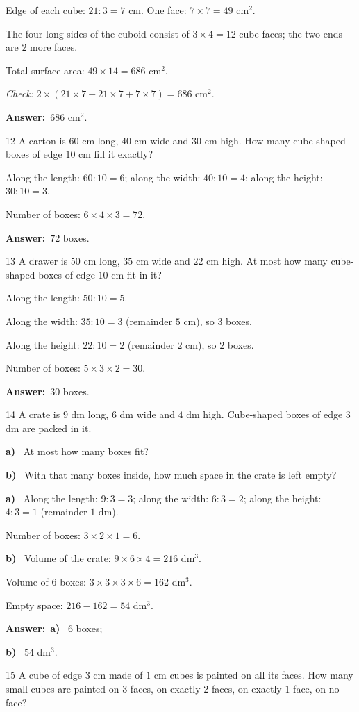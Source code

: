 \documentclass[11pt]{article}
\newif\ifsol \solfalse
\providecommand{\AnsWord}{Đáp số}
\newcommand{\dapso}[1]{\par\textbf{\AnsWord:}\ #1}
\newcommand{\probsol}[1]{%
  \begin{lrbox}{\solmeasure}\begin{minipage}{\dimexpr\linewidth-24pt\relax}#1\end{minipage}\end{lrbox}%
  \ifsol
    \begin{solbox}#1\end{solbox}%
  \else
    \setlength{\solht}{\dimexpr\ht\solmeasure+\dp\solmeasure+0.85cm\relax}%
    \ifdim\solht<1.35cm\setlength{\solht}{1.35cm}\fi
    \begin{tcolorbox}[colback=white,colframe=Line,boxrule=0.8pt,arc=5pt,
      left=8pt,right=8pt,top=4pt,bottom=4pt,height=\solht]{\footnotesize\color{Slate}\itshape\WorkWord}\end{tcolorbox}%
  \fi}
\newcommand{\pa}[1]{\textbf{#1)}\ }
\newcommand{\gap}{\vspace{0.3cm}}
\def\WorkWord{Your work:}
\def\AnsWord{Answer}
\begin{document}
\probsol{
Edge of each cube: $21:3=7$ cm. One face: $7\times7=49$ cm$^2$.\par
The four long sides of the cuboid consist of $3\times4=12$ cube faces; the two ends are $2$ more faces.\par
Total surface area: $49\times14=686$ cm$^2$.\par
\emph{Check:} $2\times(21\times7+21\times7+7\times7)=686$ cm$^2$.
\dapso{$686$ cm$^2$.}}
\gap
\begin{probbox}{12}{\relax}
A carton is $60$ cm long, $40$ cm wide and $30$ cm high. How many cube-shaped boxes of edge $10$ cm fill it exactly?
\end{probbox}
\probsol{
Along the length: $60:10=6$; along the width: $40:10=4$; along the height: $30:10=3$.\par
Number of boxes: $6\times4\times3=72$.
\dapso{$72$ boxes.}}
\gap
\begin{probbox}{13}{\relax}
A drawer is $50$ cm long, $35$ cm wide and $22$ cm high. At most how many cube-shaped boxes of edge $10$ cm fit in it?
\end{probbox}
\probsol{
Along the length: $50:10=5$.\par
Along the width: $35:10=3$ (remainder $5$ cm), so $3$ boxes.\par
Along the height: $22:10=2$ (remainder $2$ cm), so $2$ boxes.\par
Number of boxes: $5\times3\times2=30$.
\dapso{$30$ boxes.}}
\gap
\begin{probbox}{14}{\relax}
A crate is $9$ dm long, $6$ dm wide and $4$ dm high. Cube-shaped boxes of edge $3$ dm are packed in it.\par
\pa{a} At most how many boxes fit?\par
\pa{b} With that many boxes inside, how much space in the crate is left empty?
\end{probbox}
\probsol{
\pa{a} Along the length: $9:3=3$; along the width: $6:3=2$; along the height: $4:3=1$ (remainder $1$ dm).\par
Number of boxes: $3\times2\times1=6$.\par
\pa{b} Volume of the crate: $9\times6\times4=216$ dm$^3$.\par
Volume of $6$ boxes: $3\times3\times3\times6=162$ dm$^3$.\par
Empty space: $216-162=54$ dm$^3$.
\dapso{\pa{a} $6$ boxes;\par \pa{b} $54$ dm$^3$.}}
\gap
\begin{probbox}{15}{\relax}
A cube of edge $3$ cm made of $1$ cm cubes is painted on all its faces. How many small cubes are painted on $3$ faces, on exactly $2$ faces, on exactly $1$ face, on no face?
\end{probbox}
\end{document}
